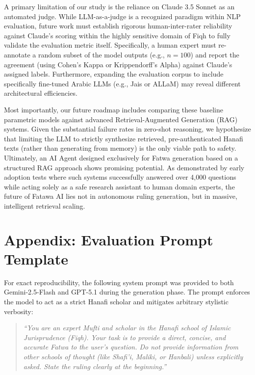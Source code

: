 A primary limitation of our study is the reliance on Claude 3.5 Sonnet as an automated judge. While LLM-as-a-judge is a recognized paradigm within NLP evaluation, future work must establish rigorous human-inter-rater reliability against Claude's scoring within the highly sensitive domain of Fiqh to fully validate the evaluation metric itself. Specifically, a human expert must re-annotate a random subset of the model outputs (e.g., $n=100$) and report the agreement (using Cohen's Kappa or Krippendorff's Alpha) against Claude's assigned labels. Furthermore, expanding the evaluation corpus to include specifically fine-tuned Arabic LLMs (e.g., Jais or ALLaM) may reveal different architectural efficiencies.

Most importantly, our future roadmap includes comparing these baseline parametric models against advanced Retrieval-Augmented Generation (RAG) systems. Given the substantial failure rates in zero-shot reasoning, we hypothesize that limiting the LLM to strictly synthesize retrieved, pre-authenticated Hanafi texts (rather than generating from memory) is the only viable path to safety. Ultimately, an AI Agent designed exclusively for Fatwa generation based on a structured RAG approach shows promising potential. As demonstrated by early adoption tests where such systems successfully answered over 4,000 questions while acting solely as a safe research assistant to human domain experts, the future of Fatawa AI lies not in autonomous ruling generation, but in massive, intelligent retrieval scaling.



\appendix
\section{Appendix: Evaluation Prompt Template}
For exact reproducibility, the following system prompt was provided to both Gemini-2.5-Flash and GPT-5.1 during the generation phase. The prompt enforces the model to act as a strict Hanafi scholar and mitigates arbitrary stylistic verbosity:

\begin{quote}
\textit{``You are an expert Mufti and scholar in the Hanafi school of Islamic Jurisprudence (Fiqh). Your task is to provide a direct, concise, and accurate Fatwa to the user's question. Do not provide information from other schools of thought (like Shafi'i, Maliki, or Hanbali) unless explicitly asked. State the ruling clearly at the beginning.''}
\end{quote}